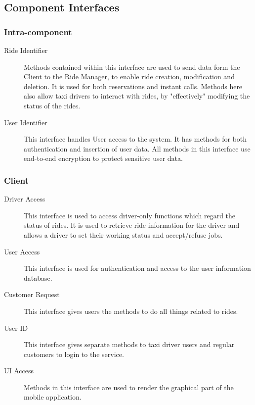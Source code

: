 \subsection{Component Interfaces}
	\subsubsection{Intra-component}
		\begin{description}
			\item[Ride Identifier]
				Methods contained within this interface are used to send data form the Client to the Ride Manager, to enable ride creation, modification and deletion. It is used for both
				reservations and instant calls. Methods here also allow taxi drivers to interact with rides, by "effectively" modifying the status of the rides.
			\item[User Identifier]
				This interface handles User access to the system. It has methods for both authentication and insertion of user data. All methods in this interface use end-to-end encryption
				to protect sensitive user data.
		\end{description}
	\subsubsection{Client}
		\begin{description}
			\item[Driver Access]
				This interface is used to access driver-only functions which regard the status of rides. It is used to retrieve ride information for the driver and allows a driver to set their working
				status and accept/refuse jobs.
			\item[User Access]
				This interface is used for authentication and access to the user information database.
			\item[Customer Request]
				This interface gives users the methods to do all things related to rides.
			\item[User ID]
				This interface gives separate methods to taxi driver users and regular customers to login to the service.
			\item[UI Access]
				Methods in this interface are used to render the graphical part of the mobile application.
		\end{description}

